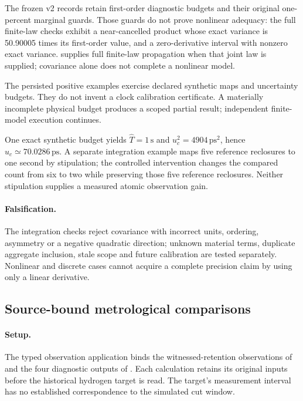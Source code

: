 The frozen v2 records retain first-order diagnostic budgets and their original one-percent marginal guards. Those guards do not prove nonlinear adequacy: the full finite-law checks exhibit a near-cancelled product whose exact variance is 50.90005 times its first-order value, and a zero-derivative interval with nonzero exact variance.  supplies full finite-law propagation when that joint law is supplied; covariance alone does not complete a nonlinear model.

The persisted positive examples exercise declared synthetic maps and uncertainty budgets. They do not invent a clock calibration certificate. A materially incomplete physical budget produces a scoped partial result; independent finite-model execution continues.

One exact synthetic budget yields \(\widehat T=1\,\mathrm{s}\) and \(u_c^2=4904\,\mathrm{ps}^2\), hence \(u_c\simeq70.0286\,\mathrm{ps}\). A separate integration example maps five reference reclosures to one second by stipulation; the controlled intervention changes the compared count from six to two while preserving those five reference reclosures. Neither stipulation supplies a measured atomic observation gain.

\paragraph{Falsification.}
The integration checks reject covariance with incorrect units, ordering, asymmetry or a negative quadratic direction; unknown material terms, duplicate aggregate inclusion, stale scope and future calibration are tested separately. Nonlinear and discrete cases cannot acquire a complete precision claim by using only a linear derivative.


\subsection{Source-bound metrological comparisons}
\label{manual2:m3-metrology}
\paragraph{Setup.}
The typed observation application binds the witnessed-retention observations of
 and the four diagnostic outputs of
. Each calculation retains its original
inputs before the historical hydrogen target is read. The target's measurement
interval has no established correspondence to the simulated cut window.

